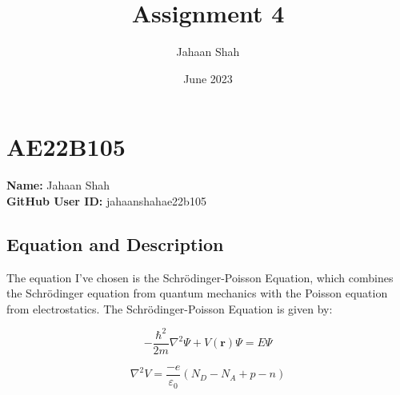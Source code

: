 \documentclass{article}
\title{Assignment 4}
\author{Jahaan Shah}
\date{June 2023}
\begin{document}
\section{AE22B105}

\textbf{Name:} Jahaan Shah \\
\textbf{GitHub User ID:} jahaanshahae22b105

\subsection{Equation and Description}

The equation I've chosen is the Schrödinger-Poisson Equation, which combines the Schrödinger equation from quantum mechanics with the Poisson equation from electrostatics. The Schrödinger-Poisson Equation is given by:

\begin{equation}
-\frac{{\hbar^2}}{{2m}} \nabla^2 \Psi + V(\mathbf{r})\Psi = E\Psi
\end{equation}

\begin{equation}
\nabla^2 V = \frac{{-e}}{{\varepsilon_0}}(N_D - N_A + p - n)
\end{equation}
\end{document}
